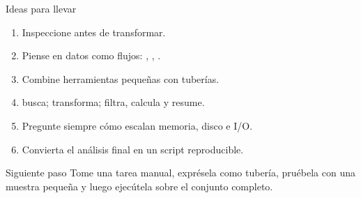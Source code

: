 \documentclass[aspectratio=169,11pt]{beamer}
\begin{document}
\begin{frame}[fragile]{Ideas para llevar}
  \begin{enumerate}
    \item Inspeccione antes de transformar.
    \item Piense en datos como flujos: , , .
    \item Combine herramientas pequeñas con tuberías.
    \item {} busca;  transforma;  filtra, calcula y resume.
    \item Pregunte siempre cómo escalan memoria, disco e I/O.
    \item Convierta el análisis final en un script reproducible.
  \end{enumerate}
  \vspace{6mm}
  \begin{wideblock}{Siguiente paso}
    Tome una tarea manual, exprésela como tubería, pruébela con una muestra pequeña y luego ejecútela sobre el conjunto completo.
  \end{wideblock}
\end{frame}

\thanksframe[Preguntas]
\end{document}
